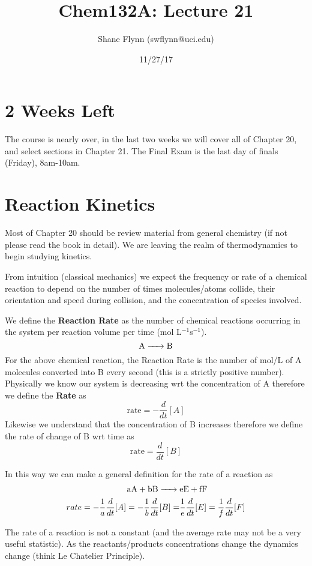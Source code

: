 \documentclass{article}
\title{Chem132A: Lecture 21}
\author{Shane Flynn (swflynn@uci.edu)}
\date{11/27/17}
\newcommand{\be}{\begin{equation}}
\newcommand{\ee}{\end{equation}}
\begin{document}
\maketitle

\section*{2 Weeks Left}
The course is nearly over, in the last two weeks we will cover all of Chapter 20, and select sections in Chapter 21.
The Final Exam is the last day of finals (Friday), 8am-10am. 

\section{Reaction Kinetics}
Most of Chapter 20 should be review material from general chemistry (if not please read the book in detail). 
We are leaving the realm of thermodynamics to begin studying kinetics. 

From intuition (classical mechanics) we expect the frequency or rate of a chemical reaction to depend on the number of times molecules/atoms collide, their orientation and speed during collision, and the concentration of species involved. 

We define the \textbf{Reaction Rate} as the number of chemical reactions occurring in the system per reaction volume per time (mol L$^{-1}$s$^{-1}$). 
\be
\ce{A -> B}
\ee
For the above chemical reaction, the Reaction Rate is the number of mol/L of A molecules converted into B every second (this is a strictly positive number). 
Physically we know our system is decreasing wrt the concentration of A therefore we define the \textbf{Rate} as
\be
\text{rate} = -\frac{d}{dt}[A]
\ee
Likewise we understand that the concentration of B increases therefore we define the rate of change of B wrt time as 
\be
\text{rate} = \frac{d}{dt}[B]
\ee

In this way we can make a general definition for the rate of a reaction as
\be
\begin{split}
\ce{aA + bB ->& eE + fF} \\
rate = -\frac{1}{a}\frac{d}{dt}[A] = -\frac{1}{b}\frac{d}{dt}[B] =& \frac{1}{e}\frac{d}{dt}[E] = \frac{1}{f}\frac{d}{dt}[F] 
\end{split}
\ee

The rate of a reaction is not a constant (and the average rate may not be a very useful statistic). 
As the reactants/products concentrations change the dynamics change (think Le Chatelier Principle).
\end{document}
